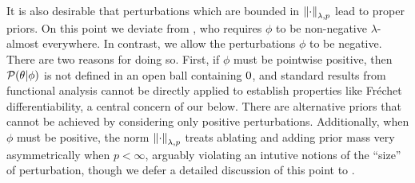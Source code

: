 It is also desirable that perturbations which are bounded in
$\left\Vert\cdot\right\Vert_{\lambda,p}$ lead to proper priors.  On this point we deviate from
\citep{gustafson:1996:local}, who requires $\phi$ to be non-negative
$\lambda$-almost everywhere.  In contrast, we allow the perturbations $\phi$ to
be negative. There are two reasons for doing so.  First, if $\phi$ must be
pointwise positive, then $\mathcal{P}(\theta \vert \phi)$ is not defined in an open ball
containing $0$, and standard results from functional analysis cannot be
directly applied to establish properties like Fr{\'e}chet differentiability, a
central concern of our  below.  There are alternative
priors that cannot be achieved by considering only positive perturbations.
Additionally, when $\phi$ must be positive, the norm $\left\Vert\cdot\right\Vert_{\lambda, p}$
treats ablating and adding prior mass very asymmetrically when $p < \infty$,
arguably violating an intutive notions of the ``size'' of perturbation, though
we defer a detailed discussion of this point to .



%
%
%



